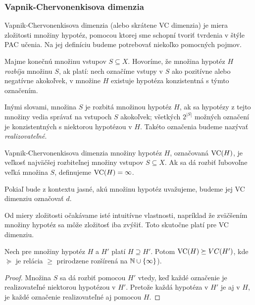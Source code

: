 \subsubsection{Vapnik-Chervonenkisova dimenzia}

Vapnik-Chervonenkisova dimenzia (alebo skrátene VC dimenzia) je miera
zložitosti množiny hypotéz, pomocou ktorej sme schopní tvoriť tvrdenia
v štýle PAC učenia. Na jej definíciu budeme potrebovať niekoľko pomocných
pojmov.

\begin{definition}
  Majme konečnú množinu vstupov $S \subseteq X$. Hovoríme, že množina
  hypotéz $H$ \emph{rozbíja} množinu $S$, ak platí: nech označíme vstupy
  v $S$ ako pozitívne alebo negatívne akokoľvek, v množine $H$ existuje
  hypotéza konzistentná s týmto označením.
\end{definition}

Inými slovami, množina $S$ je rozbitá množinou hypotéz $H$, ak sa hypotézy
z tejto množiny vedia správať na vstupoch $S$ akokoľvek; všetkých $2^{|S|}$
možných označení je konzistentných s niektorou hypotézou v $H$. Takéto
označenia budeme nazývať \emph{realizovateľné}.

\begin{definition}
  Vapnik-Chervonenkisova dimenzia množiny hypotéz $H$, označovaná
  $\mathrm{VC}(H)$, je veľkosť najväčšej rozbiteľnej množiny vstupov $S \subseteq X$.
  Ak sa dá rozbiť ľubovoľne veľká množina $S$, definujeme $\mathrm{VC}(H) = \infty$.
\end{definition}

Pokiaľ bude z kontextu jasné, akú množinu hypotéz uvažujeme, budeme jej
VC dimenziu označovať $d$.

Od miery zložitosti očakávame isté intuitívne vlastnosti, napríklad že
zväčšením množiny hypotéz sa môže zložitosť iba zvýšiť. Toto skutočne
platí pre VC dimenziu.

\begin{theorem}
  Nech pre množiny hypotéz $H$ a $H'$ platí $H \supseteq H'$. Potom
  $\mathrm{VC}(H) \succeq VC(H')$, kde $\succeq$ je relácia $\geq$ prirodzene
  rozšírená na $\mathbb{N} \cup \{ \infty \}$).
\end{theorem}
\begin{proof}
  Množina $S$ sa dá rozbiť pomocou $H'$ vtedy, keď každé označenie je
  realizovateľné niektorou hypotézou v $H'$. Pretože každá hypotéza v
  $H'$ je aj v $H$, je každé označenie realizovateľné aj pomocou $H$.
\end{proof}


